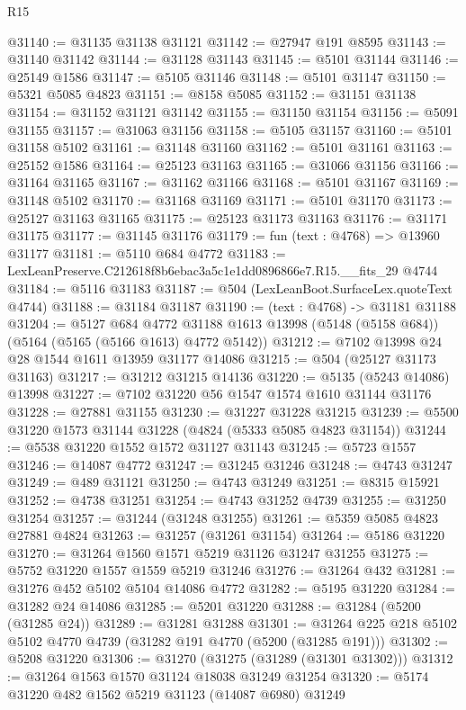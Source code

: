 \begin{lexlean}{R15}
\begin{coremodule}
{{{{{{{{{{{@31140 := @31135 @31138 @31121
@31142 := @27947 @191 @8595
@31143 := @31140 @31142
@31144 := @31128 @31143
@31145 := @5101 @31144
@31146 := @25149 @1586
@31147 := @5105 @31146
@31148 := @5101 @31147
@31150 := @5321 @5085 @4823
@31151 := @8158 @5085
@31152 := @31151 @31138
@31154 := @31152 @31121 @31142
@31155 := @31150 @31154
@31156 := @5091 @31155
@31157 := @31063 @31156
@31158 := @5105 @31157
@31160 := @5101 @31158 @5102
@31161 := @31148 @31160
@31162 := @5101 @31161
@31163 := @25152 @1586
@31164 := @25123 @31163
@31165 := @31066 @31156
@31166 := @31164 @31165
@31167 := @31162 @31166
@31168 := @5101 @31167
@31169 := @31148 @5102
@31170 := @31168 @31169
@31171 := @5101 @31170
@31173 := @25127 @31163 @31165
@31175 := @25123 @31173 @31163
@31176 := @31171 @31175
@31177 := @31145 @31176
@31179 := fun (text : @4768) => @13960 @31177
@31181 := @5110 @684 @4772
@31183 := LexLeanPreserve.C212618f8b6ebac3a5c1e1dd0896866e7.R15.__fits_29 @4744
@31184 := @5116 @31183
@31187 := @504 (LexLeanBoot.SurfaceLex.quoteText @4744)
@31188 := @31184 @31187
@31190 := (text : @4768) -> @31181 @31188
@31204 := @5127
    @684
    @4772
    @31188
    @1613
    @13998
    (@5148 (@5158 @684))
    (@5164 (@5165 (@5166 @1613) @4772 @5142))
@31212 := @7102 @13998 @24 @28 @1544 @1611 @13959 @31177 @14086
@31215 := @504 (@25127 @31173 @31163)
@31217 := @31212 @31215 @14136
@31220 := @5135 (@5243 @14086) @13998
@31227 := @7102 @31220 @56 @1547 @1574 @1610 @31144 @31176
@31228 := @27881 @31155
@31230 := @31227 @31228 @31215
@31239 := @5500 @31220 @1573 @31144 @31228 (@4824 (@5333 @5085 @4823 @31154))
@31244 := @5538 @31220 @1552 @1572 @31127 @31143
@31245 := @5723 @1557
@31246 := @14087 @4772
@31247 := @31245 @31246
@31248 := @4743 @31247
@31249 := @489 @31121
@31250 := @4743 @31249
@31251 := @8315 @15921
@31252 := @4738 @31251
@31254 := @4743 @31252 @4739
@31255 := @31250 @31254
@31257 := @31244 (@31248 @31255)
@31261 := @5359 @5085 @4823 @27881 @4824
@31263 := @31257 (@31261 @31154)
@31264 := @5186 @31220
@31270 := @31264 @1560 @1571 @5219 @31126 @31247 @31255
@31275 := @5752 @31220 @1557 @1559 @5219 @31246
@31276 := @31264 @432
@31281 := @31276 @452 @5102 @5104 @14086 @4772
@31282 := @5195 @31220
@31284 := @31282 @24 @14086
@31285 := @5201 @31220
@31288 := @31284 (@5200 (@31285 @24))
@31289 := @31281 @31288
@31301 := @31264 @225 @218 @5102 @5102 @4770 @4739 (@31282 @191 @4770 (@5200 (@31285 @191)))
@31302 := @5208 @31220
@31306 := @31270 (@31275 (@31289 (@31301 @31302)))
@31312 := @31264 @1563 @1570 @31124 @18038 @31249 @31254
@31320 := @5174 @31220 @482 @1562 @5219 @31123 (@14087 @6980) @31249
}}}}}}}}}}}
\end{coremodule}
\end{lexlean}
